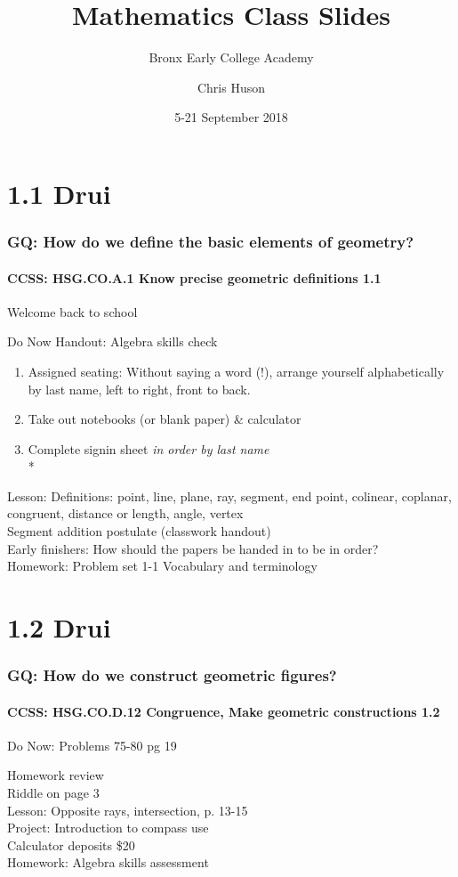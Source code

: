 \documentclass{beamer}
\title{Mathematics Class Slides}
\subtitle{Bronx Early College Academy}
\author{Chris Huson}
\date{5-21 September 2018}
\begin{document}
\frame{\titlepage}
\section[Outline]{}
\frame{\tableofcontents}

\section{1.1 Drui}
\frame
{
  \frametitle{GQ: How do we define the basic elements of geometry?}
  \framesubtitle{CCSS: HSG.CO.A.1 Know precise geometric definitions  \alert{1.1}}

  Welcome back to school
  \begin{block}{Do Now Handout: Algebra skills check}
  \begin{enumerate}
      \item Assigned seating: \alert{Without saying a word (!),} arrange yourself alphabetically by last name, left to right, front to back.
      \item Take out notebooks (or blank paper) \& calculator
      \item Complete signin sheet \emph{in order by last name}\\*
  \end{enumerate}
  \end{block}
  Lesson: Definitions: point, line, plane, ray, segment, end point, colinear, coplanar, congruent, distance or length, angle, vertex \\%
  Segment addition postulate (classwork handout)\\
  Early finishers: How should the papers be handed in to be in order?\\
  Homework: Problem set 1-1 Vocabulary and terminology
}

\section{1.2 Drui}
\frame
{
  \frametitle{GQ: How do we construct geometric figures?}
  \framesubtitle{CCSS: HSG.CO.D.12 Congruence, Make geometric constructions \qquad \alert{1.2}}

  \begin{block}{Do Now: Problems 75-80 pg 19}
  \end{block}
  Homework review\\
  Riddle on page 3\\
  Lesson: Opposite rays, intersection, p. 13-15\\
  Project: Introduction to compass use\\
  Calculator deposits \$20
  \\%
  Homework: Algebra skills assessment
}
\end{document}

